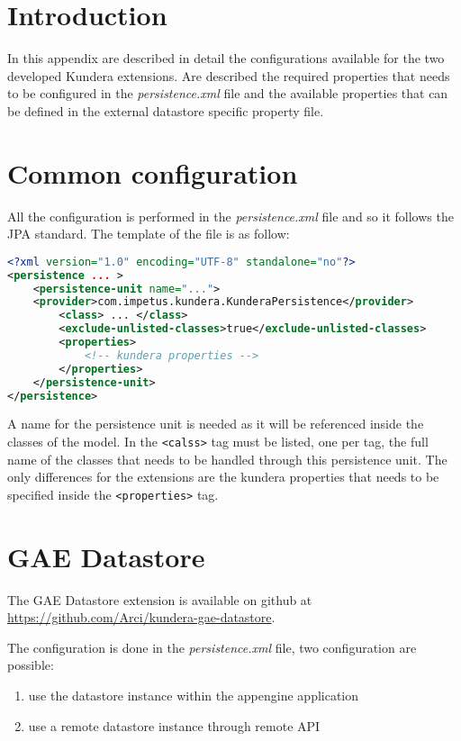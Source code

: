 \section{Introduction}
In this appendix are described in detail the configurations available for the two developed Kundera extensions. Are described the required properties that needs to be configured in the \textit{persistence.xml} file and the available properties that can be defined in the external datastore specific property file.

\section{Common configuration}
All the configuration is performed in the \textit{persistence.xml} file and so it follows the JPA standard.
The template of the file is as follow:

\begin{lstlisting}[language=XML, caption=persistence.xml template]
<?xml version="1.0" encoding="UTF-8" standalone="no"?>
<persistence ... >
    <persistence-unit name="...">
    <provider>com.impetus.kundera.KunderaPersistence</provider>
        <class> ... </class>
        <exclude-unlisted-classes>true</exclude-unlisted-classes>
        <properties>
            <!-- kundera properties -->
        </properties>
    </persistence-unit>
</persistence>
\end{lstlisting}

\noindent A name for the persistence unit is needed as it will be referenced inside the classes of the model.
In the \texttt{<calss>} tag must be listed, one per tag, the full name of the classes that needs to be handled through this persistence unit.
The only differences for the extensions are the kundera properties that needs to be specified inside the \texttt{<properties>} tag.

\section{GAE Datastore}
\label{appendix:datastore-config}
The GAE Datastore extension is available on github at \url{https://github.com/Arci/kundera-gae-datastore}.

\newparagraph The configuration is done in the \textit{persistence.xml} file, two configuration are possible:
\begin{enumerate}
\item use the datastore instance within the appengine application
\item use a remote datastore instance through remote API
\end{enumerate}


